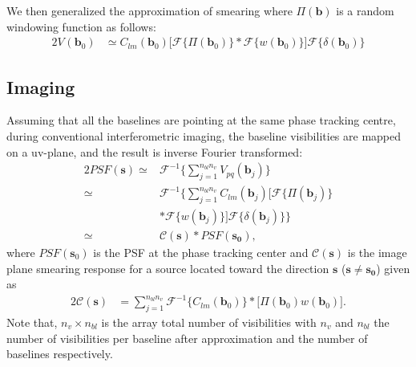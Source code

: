 We then generalized the approximation of smearing where $\Pi(\mathbf{b})$ is a random windowing function 
as follows:
\begin{alignat*}{2}
V_{}(\mathbf{b}_0) &\simeq C_{lm}(\mathbf{b}_0)\Bigg[\mathcal{F}\Big\{\Pi(\mathbf{b}_0)\Big\}*\mathcal{F}\Big\{w(\mathbf{b}_0)\Big\}\Bigg]\mathcal{F}\Big\{\delta(\mathbf{b}_0)\Big\}
\end{alignat*}
\subsection{Imaging} 
Assuming that all the baselines are pointing at the same phase tracking centre, during conventional interferometric imaging,
the baseline visibilities are mapped on a uv-plane, and the result is inverse Fourier transformed:
\begin{alignat}{2}
PSF(\mathbf{s}) \simeq & \mathcal{F}^{-1}\Bigg\{\sum_{j=1}^{n_{bl}n_v}V_{pq}(\mathbf{b}_j)\Bigg\}\\
		\simeq & \mathcal{F}^{-1}\Bigg\{\sum_{j=1}^{n_{bl}n_v} C_{lm}(\mathbf{b}_j)\Bigg[\mathcal{F}\Big\{\Pi(\mathbf{b}_j)\Big\}\\
		&*\mathcal{F}\Big\{w(\mathbf{b}_j)\Big\}\Bigg]\mathcal{F}\Big\{\delta(\mathbf{b}_j)\Big\} \Bigg\}\\
		\simeq & \mathcal{C}(\mathbf{s})*PSF(\mathbf{s_0}),
\end{alignat}
where $PSF(\mathbf{s}_0)$ is the PSF at the phase tracking center
and $\mathcal{C}(\mathbf{s})$ is the image plane smearing response for a source
located toward the direction $\mathbf{s}$ ($\mathbf{s}\neq \mathbf{s_0}$) given as
\begin{alignat}{2}
\mathcal{C}(\mathbf{s}) &= \sum_{j=1}^{n_{bl}n_v}\mathcal{F}^{-1}\Big\{C_{lm}(\mathbf{b}_0)\Big\}*\Bigg[\Pi(\mathbf{b}_0)w(\mathbf{b}_0)\Bigg].
\end{alignat}
Note that, $n_v\times n_{bl}$ is the array 
total number of visibilities with $n_v$ and $n_{bl}$ the number of visibilities per 
baseline after approximation and the number of baselines respectively.\\

